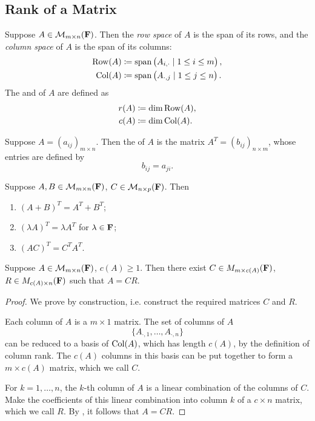 \subsection{Rank of a Matrix}
\begin{definition}
Suppose $A\in\mathcal{M}_{m\times n}(\mathbf F)$. Then the \emph{row space} of $A$ is the span of its rows, and the \emph{column space} of $A$ is the span of its columns:
\begin{align*}
\operatorname{Row}(A)&\coloneqq\operatorname{span}\left(A_{i,\cdot}\mid 1\le i\le m\right),\\
\operatorname{Col}(A)&\coloneqq\operatorname{span}\left(A_{\cdot,j}\mid 1\le j\le n\right).
\end{align*}
The  and  of $A$ are defined as
\begin{align*}
r(A)&\coloneqq\dim\operatorname{Row}(A),\\
c(A)&\coloneqq\dim\operatorname{Col}(A).
\end{align*}
\end{definition}

\begin{definition}[Transpose]
Suppose $A=(a_{ij})_{m\times n}$. Then the  of $A$ is the matrix $A^T=(b_{ij})_{n\times m}$, whose entries are defined by
\[b_{ij}=a_{ji}.\]
\end{definition}

\begin{proposition}
Suppose $A,B\in\mathcal{M}_{m\times n}(\mathbf F)$, $C\in\mathcal{M}_{n\times p}(\mathbf F)$. Then
\begin{enumerate}[label=(\roman*)]
\item $(A+B)^T=A^T+B^T$;
\item $(\lambda A)^T=\lambda A^T$ for $\lambda\in\mathbf F$;
\item $(AC)^T=C^TA^T$.
\end{enumerate}
\end{proposition}

\begin{lemma}\label{lemma:column-row-factorisation}
Suppose $A\in\mathcal{M}_{m\times n}(\mathbf F)$, $c(A)\ge1$. Then there exist  $C\in M_{m\times c(A)}(\mathbf F)$, $R\in M_{c(A)\times n}(\mathbf F)$ such that $A=CR$.
\end{lemma}

\begin{proof}
We prove by construction, i.e. construct the required matrices $C$ and $R$.

Each column of $A$ is a $m\times1$ matrix. The set of columns of $A$
\[\{A_{\cdot,1},\dots,A_{\cdot,n}\}\] 
can be reduced to a basis of $\operatorname{Col}(A)$, which has length $c(A)$, by the definition of column rank. The $c(A)$ columns in this basis can be put together to form a $m\times c(A)$ matrix, which we call $C$.

For $k=1,\dots,n$, the $k$-th column of $A$ is a linear combination of the columns of $C$. Make the coefficients of this linear combination into column $k$ of a $c\times n$ matrix, which we call $R$. By , it follows that $A=CR$.
\end{proof}

